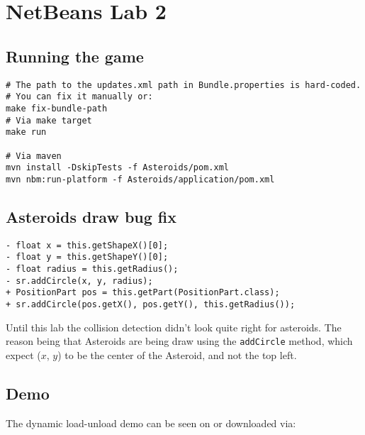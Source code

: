 \section{NetBeans Lab 2}

\subsection{Running the game}
\begin{verbatim}
# The path to the updates.xml path in Bundle.properties is hard-coded.
# You can fix it manually or:
make fix-bundle-path
# Via make target
make run

# Via maven
mvn install -DskipTests -f Asteroids/pom.xml
mvn nbm:run-platform -f Asteroids/application/pom.xml
\end{verbatim}

\subsection{Asteroids draw bug fix}
\begin{verbatim}
- float x = this.getShapeX()[0];
- float y = this.getShapeY()[0];
- float radius = this.getRadius();
- sr.addCircle(x, y, radius);
+ PositionPart pos = this.getPart(PositionPart.class);
+ sr.addCircle(pos.getX(), pos.getY(), this.getRadius());
\end{verbatim}
Until this lab the collision detection didn't look quite right for asteroids.
The reason being that Asteroids are being draw using the \texttt{addCircle}
method, which expect ($x$, $y$) to be the center of the Asteroid, and not the top left.

\subsection{Demo}
The dynamic load-unload demo can be seen on
 or downloaded via:

